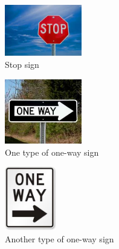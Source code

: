 \documentclass[10pt,twocolumn,letterpaper]{article}
\begin{document}
\begin{figure}[ht!]
\centering
\includegraphics[width=0.3\textwidth]{img/stop}
\caption{Stop sign}
\label{fig:stop_sign}
\end{figure}

\begin{figure}[ht!]
\centering
\includegraphics[width=0.3\textwidth]{img/one-way1}
\caption{One type of one-way sign}
\label{fig:one-way1}
\end{figure}

\begin{figure}[ht!]
\centering
\includegraphics[width=0.2\textwidth]{img/one-way2}
\caption{Another type of one-way sign}
\label{fig:one-way2}
\end{figure}


{\small


}
\end{document}

